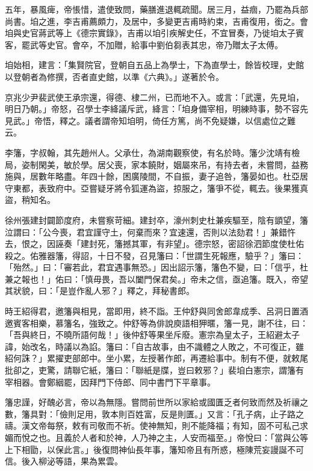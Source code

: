 \begin{pinyinscope}
 五年，暴風痺，帝悵惜，遣使致問，藥膳進退輒疏聞。居三月，益痼，乃罷為兵部尚書。垍之進，李吉甫薦頗力，及居中，多變更吉甫時約束，吉甫復用，銜之。會垍與史官蔣武等上《德宗實錄》，吉甫以垍引疾解史任，不宜冒奏，乃徙垍太子賓客，罷武等史官。會卒，不加贈，給事中劉伯芻表其忠，帝乃贈太子太傅。



 垍始相，建言：「集賢院官，登朝自五品上為學士，下為直學士，餘皆校理，史館以登朝者為修撰，否者直史館，以準《六典》。」遂著於令。



 京兆少尹裴武使王承宗還，得德、棣二州，已而地不入。或言：「武還，先見垍，明日乃朝。」帝怒，召學士李絳議斥武，絳言：「垍身備宰相，明練時事，勢不容先見武。」帝悟，釋之。議者謂帝知垍明，倚任方篤，尚不免疑嫌，以信處位之難云。



 李籓，字叔翰，其先趙州人。父承仕，為湖南觀察使，有名於時。籓少沈靖有檢局，姿制閑美，敏於學。居父喪，家本饒財，姻屬來吊，有持去者，未嘗問，益務施與，居數年略盡。年四十餘，困廣陵間，不自振，妻子追咎，籓晏如也。杜亞居守東都，表致府中。亞嘗疑牙將令狐運為盜，掠服之，籓爭不從，輒去。後果獲真盜，稍知名。



 徐州張建封闢節度府，未嘗察苛細。建封卒，濠州刺史杜兼疾驅至，陰有顗望，籓泣謂曰：「公今喪，君宜謹守土，何棄而來？宜速還，否則以法劾君！」兼錯忤去，恨之，因誣奏「建封死，籓撼其軍，有非望」。德宗怒，密詔徐泗節度使杜佑殺之。佑雅器籓，得詔，十日不發，召見籓曰：「世謂生死報應，驗乎？」籓曰：「殆然。」曰：「審若此，君宜遇事無恐。」因出詔示籓，籓色不變，曰：「信乎，杜兼之報也！」佑曰：「慎毋畏，吾以闔門保君矣。」帝未之信，亟追籓。既入，帝望其狀貌，曰：「是豈作亂人邪？」釋之，拜秘書郎。



 時王紹得君，邀籓與相見，當即用，終不詣。王仲舒與同舍郎韋成季、呂洞日置酒邀賓客相樂，慕籓名，強致之。仲舒等為俳說庾語相狎暱，籓一見，謝不往，曰：「吾與終日，不曉所語何哉！」後仲舒等果坐斥廢。憲宗為皇太子，王紹避太子諱，始改名，時議以為諂。籓曰：「自古故事，由不識體之人敗之，不可復正，雖紹何誅？」累擢吏部郎中。坐小累，左授著作郎，再遷給事中。制有不便，就敕尾批卻之，吏驚，請聯它紙，籓曰：「聯紙是牒，豈曰敕邪？」裴垍白憲宗，謂籓有宰相器。會鄭絪罷，因拜門下侍郎、同中書門下平章事。



 籓忠謹，好醜必言，帝以為無隱。嘗問前世所以家給或國匱乏者何致而然及祈禳之數，籓具對：「儉則足用，敦本則百姓富，反是則匱。」又言：「孔子病，止子路之禱。漢文帝每祭，敕有司敬而不祈。使神無知，則不能降福；有知，固不可私己求媚而悅之也。且義於人者和於神，人乃神之主，人安而福至。」帝悅曰：「當與公等上下相勖，以保此言。」後復問神仙長年事，籓知帝且有所惑，極陳荒妄謾誕不可信。後入柳泌等語，果為累雲。




\end{pinyinscope}
